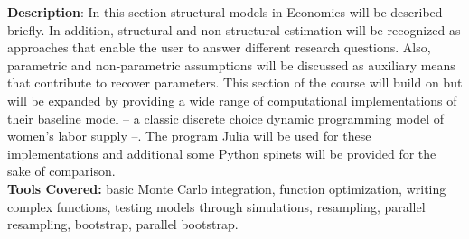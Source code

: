 \noindent \textbf{Description}: In this section structural models in Economics will be described briefly. In addition, structural and non-structural estimation will be recognized as approaches that enable the user to answer different research questions. Also, parametric and non-parametric assumptions will be discussed as auxiliary means that contribute to recover parameters. This section of the course will build on \citet{keane2011structural} but will be expanded by providing a wide range of computational implementations of their baseline model – a classic discrete choice dynamic programming model of women's labor supply –. The program Julia will be used for these implementations and additional some Python spinets will be provided for the sake of comparison.\\
\textbf{Tools Covered:} basic Monte Carlo integration, function optimization, writing complex functions, testing models through simulations,  resampling, parallel resampling, bootstrap, parallel bootstrap. 


\clearpage


